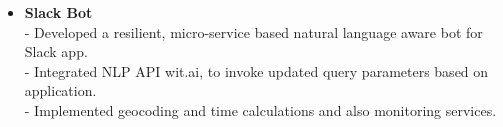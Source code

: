 \begin{itemize}
 \item \textbf{Slack Bot} \\
 - Developed a resilient, micro-service based natural language aware bot for Slack app.\\
 - Integrated NLP API wit.ai, to invoke updated query parameters based on application.\\
 - Implemented geocoding and time calculations and also monitoring services.





\end{itemize}
